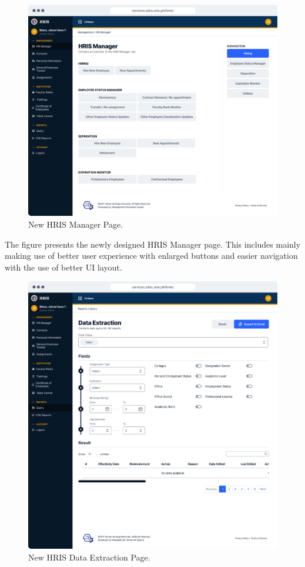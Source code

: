     \begin{figure}[H]
        \centering
        \includegraphics[width=1\linewidth]{figures/app/manager.png}
        \caption{New HRIS Manager Page.}
        \label{fig:app-manager}
    \end{figure}

    The figure presents the newly designed HRIS Manager page. This includes mainly making use of better user experience with enlarged buttons and easier navigation with the use of better UI layout.

    \begin{figure}[H]
        \centering
        \includegraphics[width=1\linewidth]{figures/app/data-extraction.png}
        \caption{New HRIS Data Extraction Page.}
        \label{fig:app-data-extraction}
    \end{figure}

